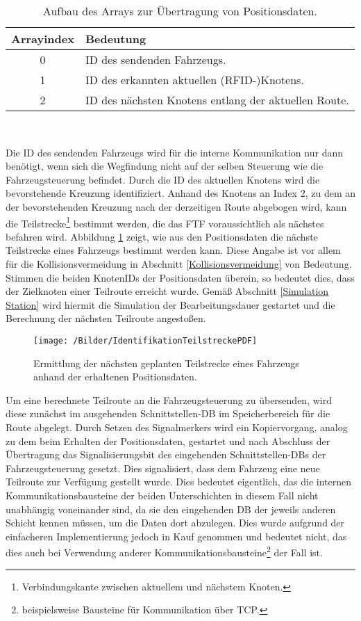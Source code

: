 		\begin{table}[h]
			\begin{tabular}{| c | l |}
				\hline
				\textbf{Arrayindex} & \textbf{Bedeutung} \\ \hline \hline
				0 & ID des sendenden Fahrzeugs. \\ \hline
				1 & ID des erkannten aktuellen (\ac{RFID}-)Knotens. \\ \hline
				2 & ID des nächsten Knotens entlang der aktuellen Route. \\
				\hline
			\end{tabular}\\
			\caption{Aufbau des Arrays zur Übertragung von Positionsdaten.}
		\end{table}
		Die ID des sendenden Fahrzeugs wird für die interne Kommunikation nur dann benötigt, wenn sich die Wegfindung nicht auf der selben Steuerung wie die Fahrzeugsteuerung befindet. Durch die ID des aktuellen Knotens wird die bevorstehende Kreuzung identifiziert. Anhand des Knotens an Index 2, zu dem an der bevorstehenden Kreuzung nach der derzeitigen Route abgebogen wird, kann die Teilstrecke\footnote{Verbindungskante zwischen aktuellem und nächstem Knoten.} bestimmt werden, die das \ac{FTF} voraussichtlich als nächstes befahren wird. Abbildung \ref{Identifikation Teilstrecke} zeigt, wie aus den Positionsdaten die nächste Teilstrecke eines Fahrzeugs bestimmt werden kann. Diese Angabe ist vor allem für die Kollisionsvermeidung in Abschnitt \ref{Kollisionsvermeidung} von Bedeutung. Stimmen die beiden KnotenIDs der Positionsdaten überein, so bedeutet dies, dass der Zielknoten einer Teilroute erreicht wurde. Gemäß Abschnitt \ref{Simulation Station} wird hiermit die Simulation der Bearbeitungsdauer gestartet und die Berechnung der nächsten Teilroute angestoßen.
		
		\begin{figure}[h]
			\centering
			\texttt{[image: /Bilder/IdentifikationTeilstreckePDF]}
			\vspace{0.2cm}
			\caption{Ermittlung der nächsten geplanten Teilstrecke eines Fahrzeugs anhand der erhaltenen Positionsdaten.}\label{Identifikation Teilstrecke}
		\end{figure}
		
		Um eine berechnete Teilroute an die Fahrzeugsteuerung zu übersenden, wird diese zunächst im ausgehenden Schnittstellen-\ac{DB} im Speicherbereich für die Route abgelegt. Durch Setzen des Signalmerkers wird ein Kopiervorgang, analog zu dem beim Erhalten der Positionsdaten, gestartet und nach Abschluss der Übertragung das Signalisierungsbit des eingehenden Schnittstellen-{DB}s der Fahrzeugsteuerung gesetzt. Dies signalisiert, dass dem Fahrzeug eine neue Teilroute zur Verfügung gestellt wurde. Dies bedeutet eigentlich, das die internen Kommunikationsbausteine der beiden Unterschichten in diesem Fall nicht unabhängig voneinander sind, da sie den eingehenden \ac{DB} der jeweils anderen Schicht kennen müssen, um die Daten dort abzulegen. Dies wurde aufgrund der einfacheren Implementierung jedoch in Kauf genommen und bedeutet nicht, das dies auch bei Verwendung anderer Kommunikationsbausteine\footnote{beispielsweise Bausteine für Kommunikation über \ac{TCP}.} der Fall ist.
				
